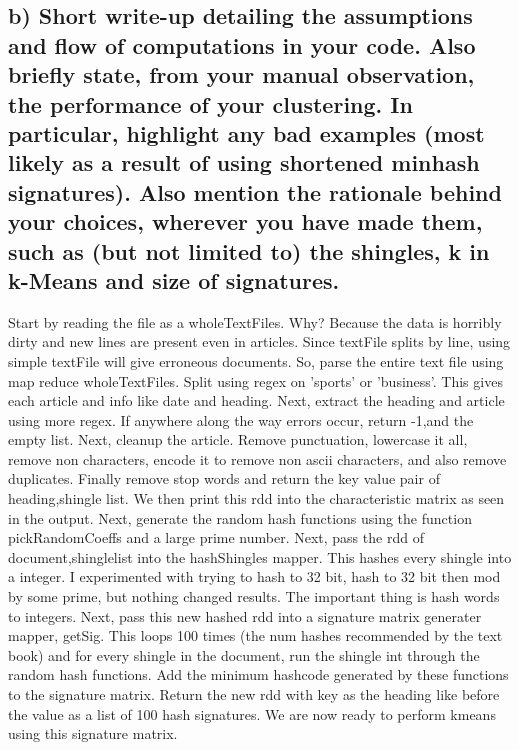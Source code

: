 \subsection*{b) Short write-up detailing the assumptions and flow of computations in your code. Also briefly state, from your manual observation, the performance of your clustering. In particular, highlight any bad examples (most likely as a result of using shortened minhash signatures). Also mention the rationale behind your choices, wherever you have made them, such as (but not limited to) the shingles, k in k-Means and size of signatures.}
Start by reading the file as a wholeTextFiles. Why? Because the data is horribly dirty and new lines are present even in articles. Since textFile splits by line, using simple textFile will give erroneous documents. So, parse the entire text file using map reduce wholeTextFiles. Split using regex on 'sports' or 'business'. This gives each article and info like date and heading. Next, extract the heading and article using more regex. If anywhere along the way errors occur, return -1,and the empty list. Next, cleanup the article. Remove punctuation, lowercase it all, remove non characters, encode it to remove non ascii characters, and also remove duplicates. Finally remove stop words and return the key value pair of heading,shingle list. We then print this rdd into the characteristic matrix as seen in the output. Next, generate the random hash functions using the function pickRandomCoeffs and a large prime number. Next, pass the rdd of document,shinglelist into the hashShingles mapper. This hashes every shingle into a integer. I experimented with trying to hash to 32 bit, hash to 32 bit then mod by some prime, but nothing changed results. The important thing is hash words to integers. Next, pass this new hashed rdd into a signature matrix generater mapper, getSig. This loops 100 times (the num hashes recommended by the text book) and for every shingle in the document, run the shingle int through the random hash functions. Add the minimum hashcode generated by these functions to the signature matrix. Return the new rdd with key as the heading like before the value as a list of 100 hash signatures. We are now ready to perform kmeans using this signature matrix. 
\\
\\
